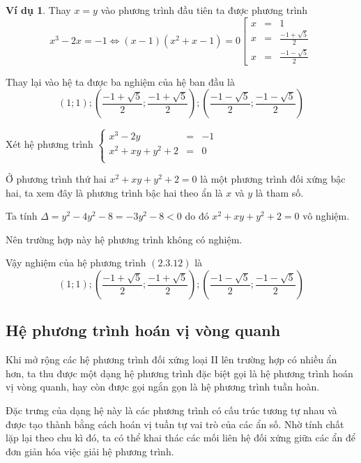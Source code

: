 \documentclass[12pt,a4paper,oneside]{book}
\theoremstyle{theorem}
\theoremstyle{definition}
\newtheorem{vd}[theorem2]{Ví dụ}
\begin{document}
\begin{vd}
Thay $x=y$ vào phương trình đầu tiên ta được phương trình \[x^3-2x=-1 \Leftrightarrow(x-1)\left(x^2+x-1\right)=0\left[
\begin{array}{lcl}
\displaystyle x&=& 1\\[1.5ex]
\displaystyle x&=&\displaystyle\frac{-1+\sqrt{5}}2\\[1.5ex]
\displaystyle x&=&\displaystyle\frac{-1-\sqrt{5}}2
\end{array}
\right.\]

Thay lại vào hệ ta được ba nghiệm của hệ ban đầu là \[\displaystyle\left(1;1\right);\left(\displaystyle\frac{-1+\sqrt{5}}2;\displaystyle\frac{-1+\sqrt{5}}2\right);\left(\displaystyle\frac{-1-\sqrt{5}}2;\displaystyle\frac{-1-\sqrt{5}}2\right)\]

Xét hệ phương trình $\left\{
\begin{array}{lcl}
\displaystyle x^3-2y&=&- 1\\[1.5ex]
\displaystyle x^2+xy+y^2+2&=&0\\
\end{array}
\right.$
\end{vd}

Ở phương trình thứ hai $x^2+xy+y^2+2=0$ là một phương trình đối xứng bậc hai, ta xem đây là phương trình bậc hai theo ẩn là $x$ và $y$ là tham số. 

Ta tính $\Delta=y^2-4y^2-8=-3y^2-8<0$ do đó $x^2+xy+y^2+2=0$ vô nghiệm.

Nên trường hợp này hệ phương trình không có nghiệm.

Vậy nghiệm của hệ phương trình $(2.3.12)$ là
\[\displaystyle\left(1;1\right);\left(\displaystyle\frac{-1+\sqrt{5}}2;\displaystyle\frac{-1+\sqrt{5}}2\right);\left(\displaystyle\frac{-1-\sqrt{5}}2;\displaystyle\frac{-1-\sqrt{5}}2\right)\]

\subsection{Hệ phương trình hoán vị vòng quanh}
Khi mở rộng các hệ phương trình đối xứng loại II lên trường hợp có nhiều ẩn
hơn, ta thu được một dạng hệ phương trình đặc biệt gọi là hệ phương trình hoán
vị vòng quanh, hay còn được gọi ngắn gọn là hệ phương trình tuần hoàn.

Đặc trưng của dạng hệ này là các phương trình có cấu trúc tương tự nhau và
được tạo thành bằng cách hoán vị tuần tự vai trò của các ẩn số. Nhờ tính chất
lặp lại theo chu kì đó, ta có thể khai thác các mối liên hệ đối xứng giữa các ẩn
để đơn giản hóa việc giải hệ phương trình.
\end{document}
